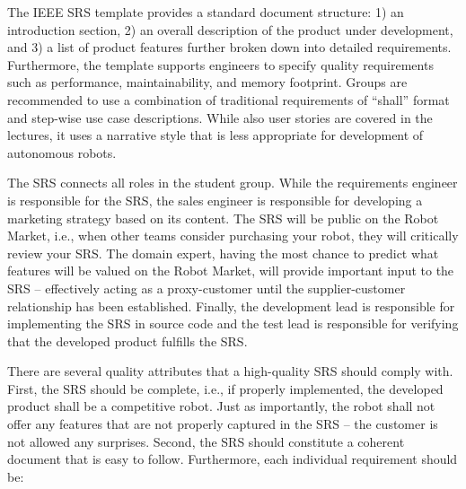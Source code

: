 \documentclass{scrreprt}
\begin{document}
The IEEE SRS template provides a standard document structure: 1) an introduction section, 2) an overall description of the product under development, and 3) a list of product features further broken down into detailed requirements. Furthermore, the template supports engineers to specify quality requirements such as performance, maintainability, and memory footprint. Groups are recommended to use a combination of traditional requirements of ``shall'' format and step-wise use case descriptions. While also user stories are covered in the lectures, it uses a narrative style that is less appropriate for development of autonomous robots.

The SRS connects all roles in the student group. While the requirements engineer is responsible for the SRS, the sales engineer is responsible for developing a marketing strategy based on its content. The SRS will be public on the Robot Market, i.e., when other teams consider purchasing your robot, they will critically review your SRS. The domain expert, having the most chance to predict what features will be valued on the Robot Market, will provide important input to the SRS -- effectively acting as a proxy-customer until the supplier-customer relationship has been established. Finally, the development lead is responsible for implementing the SRS in source code and the test lead is responsible for verifying that the developed product fulfills the SRS.

There are several quality attributes that a high-quality SRS should comply with. First, the SRS should be complete, i.e., if properly implemented, the developed product shall be a competitive robot. Just as importantly, the robot shall not offer any features that are not properly captured in the SRS -- the customer is not allowed any surprises. Second, the SRS should constitute a coherent document that is easy to follow. Furthermore, each individual requirement should be:
\end{document}
